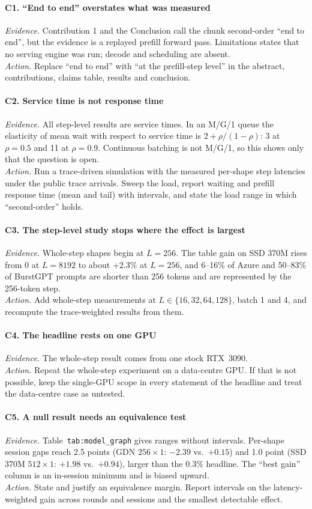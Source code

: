\documentclass[11pt]{article}
\newcommand{\finding}[2]{\paragraph{#1. #2}}
\newcommand{\evidence}{\textit{Evidence.} }
\newcommand{\action}{\textit{Action.} }
\begin{document}
\finding{C1}{``End to end'' overstates what was measured}
\evidence Contribution 1 and the Conclusion call the chunk second-order ``end to end'',
but the evidence is a replayed prefill forward pass. Limitations states that no serving
engine was run; decode and scheduling are absent.\\
\action Replace ``end to end'' with ``at the prefill-step level'' in the abstract,
contributions, claims table, results and conclusion.

\finding{C2}{Service time is not response time}
\evidence All step-level results are service times. In an M/G/1 queue the elasticity of
mean wait with respect to service time is $2+\rho/(1-\rho)$: 3 at $\rho=0.5$ and 11 at
$\rho=0.9$. Continuous batching is not M/G/1, so this shows only that the question is
open.\\
\action Run a trace-driven simulation with the measured per-shape step latencies under
the public trace arrivals. Sweep the load, report waiting and prefill response time
(mean and tail) with intervals, and state the load range in which ``second-order'' holds.

\finding{C3}{The step-level study stops where the effect is largest}
\evidence Whole-step shapes begin at $L=256$. The table gain on SSD 370M rises from 0 at
$L=8192$ to about $+2.3\%$ at $L=256$, and 6--16\% of Azure and 50--83\% of BurstGPT
prompts are shorter than 256 tokens and are represented by the 256-token step.\\
\action Add whole-step measurements at $L\in\{16,32,64,128\}$, batch 1 and 4, and
recompute the trace-weighted results from them.

\finding{C4}{The headline rests on one GPU}
\evidence The whole-step result comes from one stock RTX~3090.\\
\action Repeat the whole-step experiment on a data-centre GPU. If that is not possible,
keep the single-GPU scope in every statement of the headline and treat the data-centre
case as untested.

\finding{C5}{A null result needs an equivalence test}
\evidence Table~\texttt{tab:model\_graph} gives ranges without intervals. Per-shape
session gaps reach 2.5 points (GDN $256\times1$: $-2.39$ vs.\ $+0.15$) and 1.0 point (SSD
370M $512\times1$: $+1.98$ vs.\ $+0.94$), larger than the 0.3\% headline. The ``best gain''
column is an in-session minimum and is biased upward.\\
\action State and justify an equivalence margin. Report intervals on the
latency-weighted gain across rounds and sessions and the smallest detectable effect.
\end{document}
